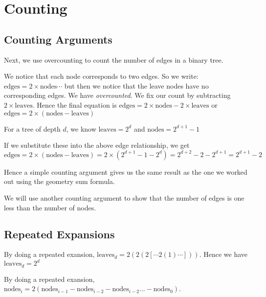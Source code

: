 
\chapter{Counting}




\section{Counting Arguments}

Next, we use overcounting to count the number of edges in a binary tree. 

\begin{example}
We notice that each node corresponds to two edges. 
So we write: $\text{edges} = 2 \times \text{nodes} \dotsm$ but then 
we notice that the leave nodes have no corresponding edges. 
We have \textit{overcounted}. We fix our count by subtracting 
$2 \times \text{leaves}$. 
Hence the final equation is $\text{edges} = 2 \times \text{nodes} - 2 \times \text{leaves}$ 
or  $\text{edges} = 2 \times (\text{nodes} - \text{leaves})$ 
\end{example}

For a tree of depth $d$, 
we know $\text{leaves} = 2^{d}$ 
and $\text{nodes} = 2^{d+1}-1$

If we substitute these into the above edge relationship, we get 
$
\text{edges} = 2 \times (\text{nodes} - \text{leaves})
= 2 \times (2^{d+1}-1 - 2^{d})
= 2^{d+2} - 2 - 2^{d+1}
= 2^{d+1} - 2
$ 

Hence a simple counting argument gives us the same result as the one 
we worked out using the geometry sum formula. 

\frmrule


\begin{example}
We will use another counting argument to show that the number of 
edges is one less than the number of nodes. 
\end{example}




\section{Repeated Expansions}




By doing a repeated exansion, $\text{leaves}_d = 2(2(2[ \dotsm 2(1) \dotsm ]))$.
Hence we have $\text{leaves}_d = 2^{d}$

By doing a repeated exansion, $\text{nodes}_i = 
2(\text{nodes}_{i-1} - \text{nodes}_{i-2} - \text{nodes}_{i-2} ... - \text{nodes}_0)$.

